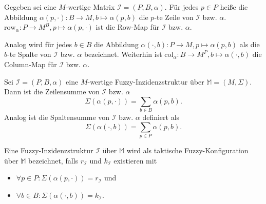 \documentclass{article}
\begin{document}
\begin{definition}
  Gegeben sei eine $M$-wertige Matrix $\mathcal{I} = (P, B, \alpha)$.
  Für jedes $p \in P$ heiße die Abbildung $\alpha(p, \cdot) \colon B \to M, b \mapsto \alpha(p, b)$
  die $p$-te Zeile von $\mathcal{I}$ bzw. $\alpha$.
  $\text{row}_\alpha \colon P \to M^B, p \mapsto \alpha(p, \cdot)$ ist die Row-Map für $\mathcal{I}$ bzw. $\alpha$.

  Analog wird für jedes $b \in B$ die Abbildung $\alpha(\cdot, b) \colon P \to M, p \mapsto \alpha(p, b)$
  als die $b$-te Spalte von $\mathcal{I}$ bzw. $\alpha$ bezeichnet.
  Weiterhin ist $\text{col}_\alpha \colon B \to M^P, b \mapsto \alpha(\cdot, b)$ die Column-Map für $\mathcal{I}$ bzw. $\alpha$.
\end{definition}

\begin{definition}
  Sei $\mathcal{I} = (P, B, \alpha)$ eine $M$-wertige Fuzzy-Inzidenzstruktur über $\mathbb{M} = (M, \Sigma)$.
  Dann ist die Zeilensumme von $\mathcal{I}$ bzw. $\alpha$
  \begin{equation*}
    \Sigma(\alpha(p, \cdot)) = \sum_{b \in B}\alpha(p, b).
  \end{equation*}
  Analog ist die Spaltensumme von $\mathcal{I}$ bzw. $\alpha$ definiert als
  \begin{equation*}
    \Sigma(\alpha(\cdot, b)) = \sum_{p \in P}\alpha(p, b).
  \end{equation*}
\end{definition}

\begin{definition}
  Eine Fuzzy-Inzidenzstruktur $\mathcal{I}$ über $\mathbb{M}$ wird als taktische Fuzzy-Konfiguration über $\mathbb{M}$ bezeichnet,
  falls $r_\mathcal{I}$ und $k_\mathcal{I}$ existieren mit
  \begin{itemize}
    \item $\forall p \in P  \colon \Sigma(\alpha(p, \cdot)) = r_\mathcal{I}$ und
    \item $\forall b \in B  \colon \Sigma(\alpha(\cdot, b)) = k_\mathcal{I}$.
  \end{itemize}
\end{definition}
\end{document}
